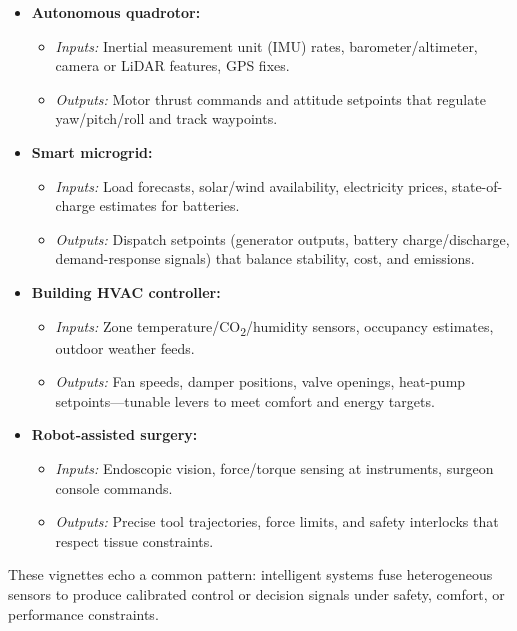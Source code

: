 \begin{itemize}
    \item \textbf{Autonomous quadrotor:}
    \begin{itemize}
        \item \emph{Inputs:} Inertial measurement unit (IMU) rates, barometer/altimeter, camera or LiDAR features, GPS fixes.
        \item \emph{Outputs:} Motor thrust commands and attitude setpoints that regulate yaw/pitch/roll and track waypoints.
    \end{itemize}

    \item \textbf{Smart microgrid:}
    \begin{itemize}
        \item \emph{Inputs:} Load forecasts, solar/wind availability, electricity prices, state-of-charge estimates for batteries.
        \item \emph{Outputs:} Dispatch setpoints (generator outputs, battery charge/discharge, demand-response signals) that balance stability, cost, and emissions.
    \end{itemize}

    \item \textbf{Building HVAC controller:}
    \begin{itemize}
        \item \emph{Inputs:} Zone temperature/CO\textsubscript{2}/humidity sensors, occupancy estimates, outdoor weather feeds.
        \item \emph{Outputs:} Fan speeds, damper positions, valve openings, heat-pump setpoints---tunable levers to meet comfort and energy targets.
    \end{itemize}

    \item \textbf{Robot-assisted surgery:}
    \begin{itemize}
        \item \emph{Inputs:} Endoscopic vision, force/torque sensing at instruments, surgeon console commands.
        \item \emph{Outputs:} Precise tool trajectories, force limits, and safety interlocks that respect tissue constraints.
    \end{itemize}
\end{itemize}

These vignettes echo a common pattern: intelligent systems fuse heterogeneous sensors to produce calibrated control or decision signals under safety, comfort, or performance constraints.

